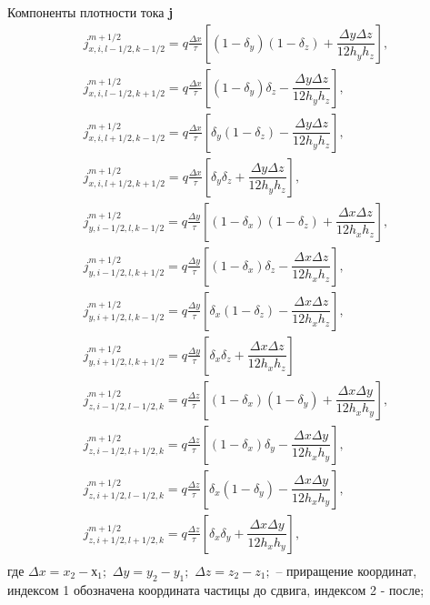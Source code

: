 Компоненты плотности тока \textbf{j}
\begin{equation}
\begin{array}{c}
j_{x,i,l-1/2,k-1/2}^{m+1/2}=q\frac{\Delta x}{\tau}\left[(1-\delta_{y})(1-\delta_{z})+\dfrac{\Delta y \Delta z}{12 h_{y}h_{z}}
\right], \\
j_{x,i,l-1/2,k+1/2}^{m+1/2}=q\frac{\Delta x}{\tau}\left[(1-\delta_{y})\delta_{z}-\dfrac{\Delta y \Delta z}{12 h_{y}h_{z}}
\right], \\
j_{x,i,l+1/2,k-1/2}^{m+1/2}=q\frac{\Delta x}{\tau}\left[\delta_{y}(1-\delta_{z})-\dfrac{\Delta y \Delta z}{12 h_{y}h_{z}}
\right], \\
j_{x,i,l+1/2,k+1/2}^{m+1/2}=q\frac{\Delta x}{\tau}\left[\delta_{y}\delta_{z}+\dfrac{\Delta y \Delta z}{12 h_{y}h_{z}}
\right], \\
j_{y,i-1/2,l,k-1/2}^{m+1/2}=q\frac{\Delta y}{\tau}\left[(1-\delta_{x})(1-\delta_{z})+\dfrac{\Delta x \Delta z}{12 h_{x}h_{z}}
\right], \\
j_{y,i-1/2,l,k+1/2}^{m+1/2}=q\frac{\Delta y}{\tau}\left[(1-\delta_{x})\delta_{z}-\dfrac{\Delta x \Delta z}{12 h_{x}h_{z}}
\right], \\
j_{y,i+1/2,l,k-1/2}^{m+1/2}=q\frac{\Delta y}{\tau}\left[\delta_{x}(1-\delta_{z})-\dfrac{\Delta x \Delta z}{12 h_{x}h_{z}}
\right], \\
j_{y,i+1/2,l,k+1/2}^{m+1/2}=q\frac{\Delta y}{\tau}\left[\delta_{x}\delta_{z}+\dfrac{\Delta x \Delta z}{12 h_{x}h_{z}}
\right] \\
j_{z,i-1/2,l-1/2,k}^{m+1/2}=q\frac{\Delta z}{\tau}\left[(1-\delta_{x})(1-\delta_{y})+\dfrac{\Delta x \Delta y}{12 h_{x}h_{y}}
\right], \\
j_{z,i-1/2,l+1/2,k}^{m+1/2}=q\frac{\Delta z}{\tau}\left[(1-\delta_{x})\delta_{y}-\dfrac{\Delta x \Delta y}{12 h_{x}h_{y}}
\right], \\
j_{z,i+1/2,l-1/2,k}^{m+1/2}=q\frac{\Delta z}{\tau}\left[\delta_{x}(1-\delta_{y})-\dfrac{\Delta x \Delta y}{12 h_{x}h_{y}}
\right], \\
j_{z,i+1/2,l+1/2,k}^{m+1/2}=q\frac{\Delta z}{\tau}\left[\delta_{x}\delta_{y}+\dfrac{\Delta x \Delta y}{12 h_{x}h_{y}}
\right], \\
\end{array}
\end{equation}
где $\Delta x=x_{2}-х_{1};$ $\Delta y=y_{2}-y_{1};$ $\Delta z=z_{2}-z_{1};$ -- приращение координат, индексом 1 обозначена координата частицы до сдвига, индексом 2 - после; 

